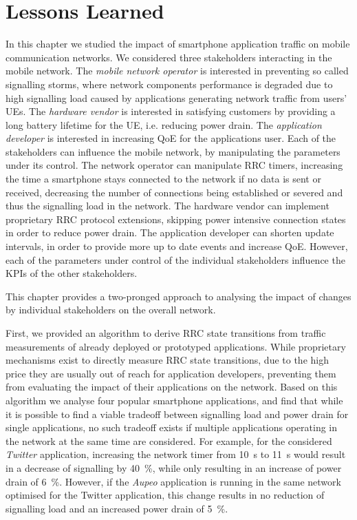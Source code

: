 \section{Lessons Learned}\label{sec:network:lessons_learned}
In this chapter we studied the impact of smartphone application traffic on mobile communication networks.
We considered three stakeholders interacting in the mobile network.
The \emph{mobile network operator} is interested in preventing so called signalling storms, where network components performance is degraded due to high signalling load caused by applications generating network traffic from users' \glspl{UE}.
The \emph{hardware vendor} is interested in satisfying customers by providing a long battery lifetime for the \gls{UE}, i.e. reducing power drain.
The \emph{application developer} is interested in increasing \gls{QoE} for the applications user.
Each of the stakeholders can influence the mobile network, by manipulating the parameters under its control.
The network operator can manipulate \gls{RRC} timers, increasing the time a smartphone stays connected to the network if no data is sent or received, decreasing the number of connections being established or severed and thus the signalling load in the network.
The hardware vendor can implement proprietary \gls{RRC} protocol extensions, skipping power intensive connection states in order to reduce power drain.
The application developer can shorten update intervals, in order to provide more up to date events and increase \gls{QoE}.
However, each of the parameters under control of the individual stakeholders influence the \glspl{KPI} of the other stakeholders.

This chapter provides a two-pronged approach to analysing the impact of changes by individual stakeholders on the overall network.

First, we provided an algorithm to derive \gls{RRC} state transitions from traffic measurements of already deployed or prototyped applications.
While proprietary mechanisms exist to directly measure \gls{RRC} state transitions, due to the high price they are usually out of reach for application developers, preventing them from evaluating the impact of their applications on the network.
Based on this algorithm we analyse four popular smartphone applications, and find that while it is possible to find a viable tradeoff between signalling load and power drain for single applications, no such tradeoff exists if multiple applications operating in the network at the same time are considered.
For example, for the considered \emph{Twitter} application, increasing the network timer \TDCH from \SI{10}{\second} to \SI{11}{\second} would result in a decrease of signalling by \SI{40}{\percent}, while only resulting in an increase of power drain of \SI{6}{\percent}.
However, if the \emph{Aupeo} application is running in the same network optimised for the Twitter application, this change results in no reduction of signalling load and an increased power drain of \SI{5}{\percent}.

